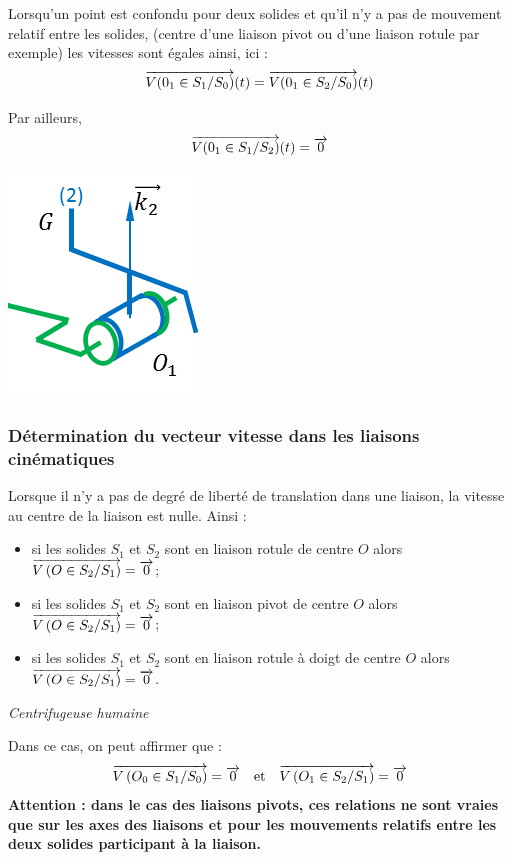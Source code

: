 \documentclass[10pt,oneside]{article}
\begin{document}
\begin{rem}
\begin{minipage}[c]{.65\linewidth}
Lorsqu'un point est confondu pour deux solides et qu'il n'y a pas de mouvement relatif entre les solides, (centre d'une liaison pivot ou d'une liaison rotule par exemple) les vitesses sont égales ainsi, ici : 
$$
\overrightarrow{V(0_1\in S_1/S_0)}(t) = \overrightarrow{V(0_1\in S_2/S_0)}(t)
$$

Par ailleurs, 
$$
\overrightarrow{V(0_1\in S_1/S_2)}(t) = \overrightarrow{0}
$$
\end{minipage}\hfill
\begin{minipage}[c]{.3\linewidth}
\begin{center}
\includegraphics[width=.6\textwidth]{png/centrifugeuse_4}
\end{center}
\end{minipage}
\end{rem}
\subsubsection{Détermination du vecteur vitesse dans les liaisons cinématiques}

\begin{resultat}
Lorsque il n'y a pas de degré de liberté de translation dans une liaison, la vitesse au centre de la liaison est nulle. Ainsi : 
\begin{itemize}
\item si les solides $S_1$ et $S_2$ sont en liaison rotule de centre $O$ alors $\overrightarrow{V\left( {O} \in {S_2}/{S_1}\right)}=\overrightarrow{0}$;
\item si les solides $S_1$ et $S_2$ sont en liaison pivot de centre $O$ alors $\overrightarrow{V\left( {O} \in {S_2}/{S_1}\right)}=\overrightarrow{0}$;
\item si les solides $S_1$ et $S_2$ sont en liaison rotule à doigt de centre $O$ alors $\overrightarrow{V\left( {O} \in {S_2}/{S_1}\right)}=\overrightarrow{0}$.
\end{itemize}
\end{resultat}
\begin{exemple}
\textit{Centrifugeuse humaine}

Dans ce cas, on peut affirmer que :
$$
 \overrightarrow{V\left( {O_0} \in {S_1}/{S_0}\right)} = \overrightarrow{0} \quad \text{et} \quad 
\overrightarrow{V\left( {O_1} \in {S_2}/{S_1}\right)} = \overrightarrow{0}
$$
\textbf{Attention : dans le cas des liaisons pivots, ces relations ne sont vraies que sur les axes des liaisons et pour les mouvements relatifs entre les deux solides participant à la liaison.} 
\end{exemple}
\end{document}
